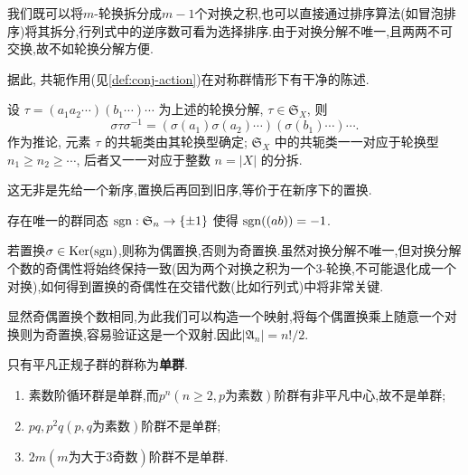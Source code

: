 我们既可以将$m$-轮换拆分成$m-1$个对换之积,也可以直接通过排序算法(如冒泡排序)将其拆分,行列式中的逆序数可看为选择排序.由于对换分解不唯一,且两两不可交换,故不如轮换分解方便.

据此, 共轭作用(见\ref{def:conj-action})在对称群情形下有干净的陈述.
\begin{lemma}\label{prop:cycle-type}
	设 $\tau = (a_1 a_2 \cdots) (b_1 \cdots) \cdots$ 为上述的轮换分解, $\tau \in \mathfrak{S}_X$, 则
	\[ \sigma \tau \sigma^{-1} = (\sigma(a_1) \sigma(a_2) \cdots) (\sigma(b_1) \cdots) \cdots. \]
	作为推论, 元素 $\tau$ 的共轭类由其轮换型确定; $\mathfrak{S}_X$ 中的共轭类一一对应于轮换型 $n_1 \geq n_2 \geq \cdots$, 后者又一一对应于整数 $n = |X|$ 的分拆.
\end{lemma}

这无非是先给一个新序,置换后再回到旧序,等价于在新序下的置换.
\begin{lemma}
	存在唯一的群同态 $\operatorname{\mathrm{sgn}}: \mathfrak{S}_n \to \{\pm 1\}$ 使得 $\operatorname{\mathrm{sgn}}((a b)) = -1$.
\end{lemma}

若置换$\sigma\in\operatorname{\mathrm{Ker}}(\operatorname{\mathrm{sgn}})$,则称为偶置换,否则为奇置换.虽然对换分解不唯一,但对换分解个数的奇偶性将始终保持一致(因为两个对换之积为一个3-轮换,不可能退化成一个对换),如何得到置换的奇偶性在交错代数(比如行列式)中将非常关键.

显然奇偶置换个数相同,为此我们可以构造一个映射,将每个偶置换乘上随意一个对换则为奇置换,容易验证这是一个双射.因此$|\mathfrak{A}_n| = n!/2$.
\begin{definition}
	只有平凡正规子群的群称为\textbf{单群}.
\end{definition}
\begin{example}
	\begin{enumerate}
		\item 素数阶循环群是单群,而$p^n(n\geqslant2,p\text{为素数})$阶群有非平凡中心,故不是单群;
		
		\item $pq,p^2q(p,q\text{为素数})$阶群不是单群;
		
		\item $2m(m\text{为大于3奇数})$阶群不是单群.
	\end{enumerate}
\end{example}


